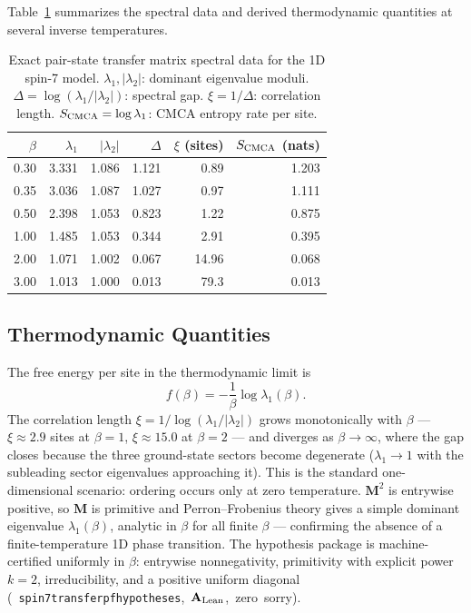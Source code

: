 \documentclass[11pt]{article}
\theoremstyle{remark}
\newcommand{\lean}[1]{%
  \penalty-100
  \begingroup\def\_{\textunderscore\allowbreak}\texttt{#1}\endgroup}
\newcommand{\CatAL}{\ensuremath{\textbf{A}_{\rm Lean}}}
\begin{document}
Table~\ref{tab:spectral} summarizes the spectral data and derived thermodynamic
quantities at several inverse temperatures.

\begin{table}[htb]
\centering
\caption{Exact pair-state transfer matrix spectral data for the 1D spin-7
model. $\lambda_1, |\lambda_2|$: dominant eigenvalue moduli.
$\Delta = \log(\lambda_1/|\lambda_2|)$: spectral gap.
$\xi = 1/\Delta$: correlation length.
$S_{\rm CMCA} = \log \lambda_1$: CMCA entropy rate per site.}
\label{tab:spectral}
\begin{tabular}{@{}rrrrrr@{}}
\toprule
$\beta$ & $\lambda_1$ & $|\lambda_2|$ & $\Delta$ & $\xi$ (sites) & $S_{\rm CMCA}$ (nats) \\
\midrule
0.30 & 3.331 & 1.086 & 1.121 & 0.89 & 1.203 \\
0.35 & 3.036 & 1.087 & 1.027 & 0.97 & 1.111 \\
0.50 & 2.398 & 1.053 & 0.823 & 1.22 & 0.875 \\
1.00 & 1.485 & 1.053 & 0.344 & 2.91 & 0.395 \\
2.00 & 1.071 & 1.002 & 0.067 & 14.96 & 0.068 \\
3.00 & 1.013 & 1.000 & 0.013 & 79.3 & 0.013 \\
\bottomrule
\end{tabular}
\end{table}

\subsection{Thermodynamic Quantities}

The free energy per site in the thermodynamic limit is
\begin{equation}
  f(\beta) = -\frac{1}{\beta} \log \lambda_1(\beta).
\end{equation}
The correlation length $\xi = 1/\log(\lambda_1/|\lambda_2|)$ grows monotonically
with $\beta$ --- $\xi \approx 2.9$ sites at $\beta = 1$, $\xi \approx 15.0$ at
$\beta = 2$ --- and diverges as $\beta \to \infty$, where the gap closes because
the three ground-state sectors become degenerate ($\lambda_1 \to 1$ with the
subleading sector eigenvalues approaching it). This is the standard
one-dimensional scenario: ordering occurs only at zero temperature.
$\mathbf{M}^2$ is entrywise positive, so $\mathbf{M}$ is primitive and
Perron--Frobenius theory gives a simple dominant eigenvalue $\lambda_1(\beta)$,
analytic in $\beta$ for all finite $\beta$ --- confirming the absence of a
finite-temperature 1D phase transition. The hypothesis package is
machine-certified uniformly in $\beta$: entrywise nonnegativity, primitivity
with explicit power $k = 2$, irreducibility, and a positive uniform diagonal
\mbox{(\lean{spin7\_transfer\_pf\_hypotheses}, \CatAL{}, zero sorry)}.
\end{document}
